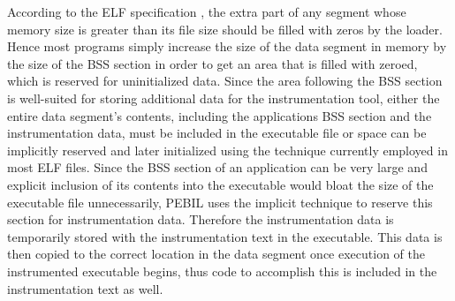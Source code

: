 According to the ELF specification \cite{standard1995executable}, the extra part
of any segment whose memory size is greater than its file size should be filled
with zeros by the loader. Hence most programs simply increase the size of the
data segment in memory by the size of the BSS section in order to get an area
that is filled with zeroed, which is reserved for uninitialized data. Since the
area following the BSS section is well-suited for storing additional data for
the instrumentation tool, either the entire data segment's contents, including
the applications BSS section and the instrumentation data, must be included in
the executable file or space can be implicitly reserved and later initialized
using the technique currently employed in most ELF files. Since the BSS section
of an application can be very large and explicit inclusion of its contents into
the executable would bloat the size of the executable file unnecessarily, PEBIL
uses the implicit technique to reserve this section for instrumentation data.
Therefore the instrumentation data is temporarily stored with the
instrumentation text in the executable. This data is then copied to the correct
location in the data segment once execution of the instrumented executable
begins, thus code to accomplish this is included in the instrumentation text as
well.
